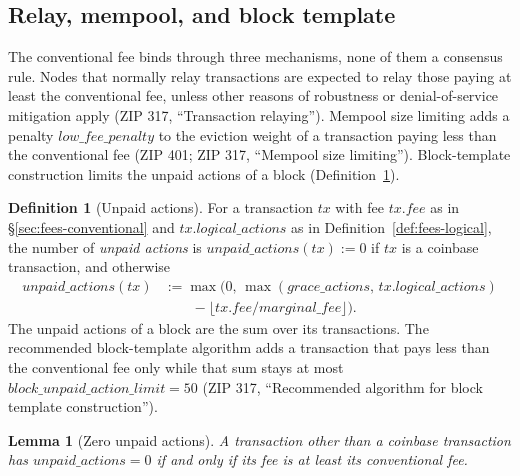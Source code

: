 \documentclass[11pt,a4paper]{article}
\newtheorem{lemma}[theorem]{Lemma}
\theoremstyle{definition}
\newtheorem{definition}[theorem]{Definition}
\begin{document}
\subsection{Relay, mempool, and block template}\label{sec:fees-relay}

The conventional fee binds through three mechanisms, none of them a
consensus rule. Nodes that normally relay transactions are expected to relay
those paying at least the conventional fee, unless other reasons of
robustness or denial-of-service mitigation apply (ZIP 317, ``Transaction
relaying''). Mempool size limiting adds a penalty $\mathit{low\_fee\_penalty}$
to the eviction weight of a transaction paying less than the conventional
fee (ZIP 401; ZIP 317, ``Mempool size limiting''). Block-template
construction limits the unpaid actions of a block
(Definition~\ref{def:fees-unpaid}).

\begin{definition}[Unpaid actions]\label{def:fees-unpaid}
For a transaction $\mathit{tx}$ with fee $\mathit{tx.fee}$ as in
\S\ref{sec:fees-conventional} and $\mathit{tx.logical\_actions}$ as in
Definition~\ref{def:fees-logical}, the number of \emph{unpaid actions} is
$\mathit{unpaid\_actions}(\mathit{tx}) := 0$ if $\mathit{tx}$ is a coinbase
transaction, and otherwise
\begin{align*}
  \mathit{unpaid\_actions}(\mathit{tx})
  &:= \max\bigl(0,\, \max(\mathit{grace\_actions},\,
    \mathit{tx.logical\_actions}) \\
  &\qquad - \lfloor \mathit{tx.fee} / \mathit{marginal\_fee} \rfloor\bigr).
\end{align*}
The unpaid actions of a block are the sum over its transactions. The
recommended block-template algorithm adds a transaction that pays less than
the conventional fee only while that sum stays at most
$\mathit{block\_unpaid\_action\_limit} = 50$ (ZIP 317, ``Recommended
algorithm for block template construction'').
\end{definition}

\begin{lemma}[Zero unpaid actions]\label{lem:fees-unpaid}
A transaction other than a coinbase transaction has
$\mathit{unpaid\_actions} = 0$ if and only if its fee is at least its
conventional fee.
\end{lemma}
\end{document}
